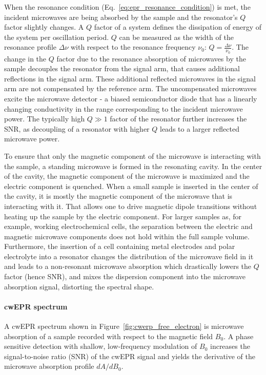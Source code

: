 \par
When the resonance condition (Eq.~\ref{eq:epr_resonance_condition}) is met, the incident microwaves are being absorbed by the sample and the resonator's $Q$ factor slightly changes. A $Q$ factor of a system defines the dissipation of energy of the system per oscillation period. $Q$ can be measured as the width of the resonance profile $\Delta\nu$ with respect to the resonance frequency $\nu_0$: $Q=\frac{\Delta\nu}{\nu_0}$. The change in the $Q$ factor due to the resonance absorption of microwaves by the sample decouples the resonator from the signal arm, that causes additional reflections in the signal arm. These additional reflected microwaves in the signal arm are not compensated by the reference arm. The uncompensated microwaves excite the microwave detector - a biased semiconductor diode that has a linearly changing conductivity in the range corresponding to the incident microwave power. The typically high $Q\gg1$ factor of the resonator further increases the SNR, as decoupling of a resonator with higher $Q$ leads to a larger reflected microwave power.

\par
To ensure that only the magnetic component of the microwave is interacting with the sample, a standing microwave is formed in the resonating cavity. In the center of the cavity, the magnetic component of the microwave is maximized and the electric component is quenched. When a small sample is inserted in the center of the cavity, it is mostly the magnetic component of the microwave that is interacting with it. That allows one to drive magnetic dipole transitions without heating up the sample by the electric component. For larger samples as, for example, working electrochemical cells, the separation between the electric and magnetic microwave components does not hold within the full sample volume. Furthermore, the insertion of a cell containing metal electrodes and polar electrolyte into a resonator changes the distribution of the microwave field in it and leads to a non-resonant microwave absorption which drastically lowers the $Q$ factor (hence SNR), and mixes the dispersion component into the microwave absorption signal, distorting the spectral shape.

\paragraph{cwEPR spectrum}
A cwEPR spectrum shown in Figure~\ref{fig:cwerp_free_electron} is microwave absorption of a sample recorded with respect to the magnetic field $B_0$. A phase sensitive detection with shallow, low-frequency modulation of $B_0$ increases the signal-to-noise ratio (SNR) of the cwEPR signal and yields the derivative of the microwave absorption profile $dA/dB_0$.



